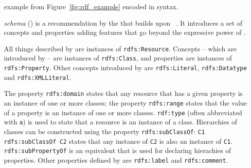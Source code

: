 \begin{mintlisting}

\caption{ example from Figure~\ref{fig:rdf_example} encoded in  syntax.}
\label{listing:turtle_example}
\end{mintlisting}

\vspace{1em}

 \emph{schema} () is a recommendation by the  that builds upon ~\cite{RDFS}. It introduces a set of concepts and properties adding features that go beyond the expressive power of .

All things described by  are instances of \texttt{rdfs:Resource}. Concepts -- which are introduced by  -- are instances of \texttt{rdfs:Class}, and properties are instances of \texttt{rdfs:\hspace{0pt}Property}. Other concepts introduced by  are \texttt{rdfs:\hspace{0pt}Literal}, \texttt{rdfs:\hspace{0pt}Datatype} and \texttt{rdfs:\hspace{0pt}XMLLiteral}.

The property \texttt{rdfs:domain} states that any resource that has a given property is an instance of one or more classes; the property \texttt{rdfs:range} states that the value of a property is an instance of one or more classes. \texttt{rdf:type} (often abbreviated with \texttt{a}) is used to state that a resource is an instance of a class. Hierarchies of classes can be constructed using the property \texttt{rdfs:subClassOf}: \texttt{C1 rdfs:subClassOf C2} states that any instance of \texttt{C2} is also an instance of \texttt{C1}. \texttt{rdfs:subPropertyOf} is an equivalent that is used for declaring hierachies of properties. Other properties defined by  are \texttt{rdfs:label} and \texttt{rdfs:comment}.

